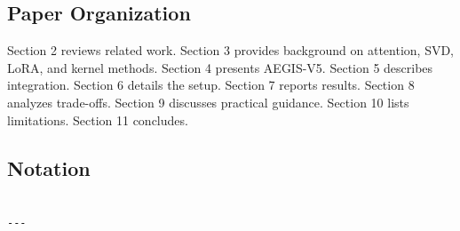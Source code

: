 \subsection{Paper Organization}

Section 2 reviews related work. Section 3 provides background on attention, 
SVD, LoRA, and kernel methods. Section 4 presents AEGIS-V5. Section 5 
describes integration. Section 6 details the setup. Section 7 reports 
results. Section 8 analyzes trade-offs. Section 9 discusses practical 
guidance. Section 10 lists limitations. Section 11 concludes.



\subsection{Notation}

\begin{lstlisting}

---
\end{lstlisting}